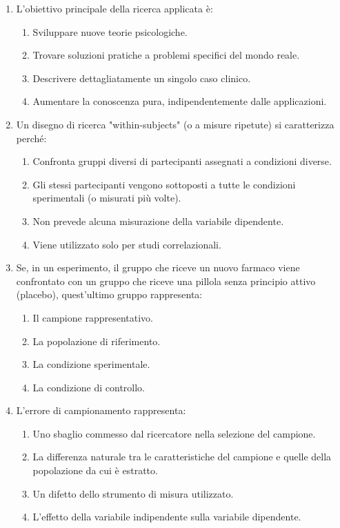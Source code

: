 \documentclass[12pt, a4paper]{article}
\begin{document}
\begin{enumerate}
    \item L'obiettivo principale della ricerca applicata è:
    \begin{enumerate}
        \item Sviluppare nuove teorie psicologiche.
        \item Trovare soluzioni pratiche a problemi specifici del mondo reale.
        \item Descrivere dettagliatamente un singolo caso clinico.
        \item Aumentare la conoscenza pura, indipendentemente dalle applicazioni.
    \end{enumerate}

    \item Un disegno di ricerca "within-subjects" (o a misure ripetute) si caratterizza perché:
    \begin{enumerate}
        \item Confronta gruppi diversi di partecipanti assegnati a condizioni diverse.
        \item Gli stessi partecipanti vengono sottoposti a tutte le condizioni sperimentali (o misurati più volte).
        \item Non prevede alcuna misurazione della variabile dipendente.
        \item Viene utilizzato solo per studi correlazionali.
    \end{enumerate}

    \item Se, in un esperimento, il gruppo che riceve un nuovo farmaco viene confrontato con un gruppo che riceve una pillola senza principio attivo (placebo), quest'ultimo gruppo rappresenta:
    \begin{enumerate}
        \item Il campione rappresentativo.
        \item La popolazione di riferimento.
        \item La condizione sperimentale.
        \item La condizione di controllo.
    \end{enumerate}

    \item L'errore di campionamento rappresenta:
    \begin{enumerate}
        \item Uno sbaglio commesso dal ricercatore nella selezione del campione.
        \item La differenza naturale tra le caratteristiche del campione e quelle della popolazione da cui è estratto.
        \item Un difetto dello strumento di misura utilizzato.
        \item L'effetto della variabile indipendente sulla variabile dipendente.
    \end{enumerate}


\end{enumerate}
\end{document}
